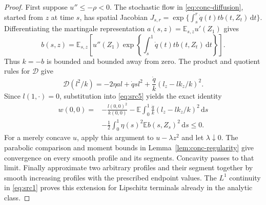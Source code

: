\documentclass[11pt,a4paper]{article}
\numberwithin{equation}{section}
\theoremstyle{definition}
\theoremstyle{remark}
\newcommand{\E}{\mathbb E}
\newcommand{\dd}{\mathrm d}
\begin{document}
\begin{proof}
First suppose $u''\leq-\rho<0$.  The stochastic flow in
\eqref{eq:conc-diffusion}, started from $z$ at time $s$, has spatial
Jacobian
$J_{s,r}=\exp\{\int_s^r\dot q(t)t b(t,Z_t)\,\dd t\}$.
Differentiating the martingale representation
$a(s,z)=\E_{s,z}u'(Z_1)$ gives
\begin{equation}
 b(s,z)=\E_{s,z}\left[u''(Z_1)
       \exp\left\{\int_s^1\dot q(t)t b(t,Z_t)\,\dd t\right\}\right].
 \label{eq:conc-curvature-flow}
\end{equation}
Thus $k=-b$ is bounded and bounded away from zero.  The product and quotient
rules for $\mathcal D$ give
\[
 \mathcal D(l^2/k)=-2\eta a l+\dot q s l^2
       +\frac{\dot q}{k}(l_z-lk_z/k)^2.
\]
Since $l(1,\cdot)=0$, substitution into \eqref{eq:src5} yields the exact
identity
\begin{equation}
 \begin{split}
 w(0,0)={}&-\frac{l(0,0)^2}{k(0,0)}
 -\E\int_0^1\frac{\dot q}{k}(l_z-lk_z/k)^2\,\dd s\\
 &-\frac12\int_0^1\eta(s)^2\E b(s,Z_s)^2\,\dd s\leq0.
 \end{split}
 \label{eq:conc-negative-squares}
\end{equation}
For a merely concave $u$, apply this argument to $u-\lambda z^2$ and
let $\lambda\downarrow0$.  The parabolic comparison and moment bounds in
Lemma~\ref{lem:conc-regularity} give convergence on every smooth profile
and its segments.  Concavity passes to that limit.  Finally approximate
two arbitrary profiles and their segment together by smooth increasing
profiles with the prescribed endpoint values.  The $L^1$ continuity in
\eqref{eq:src1} proves this extension for Lipschitz terminals already in
the analytic class.


\end{proof}
\end{document}
